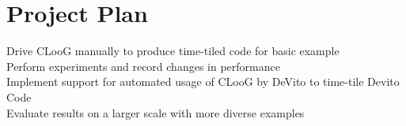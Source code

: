 \documentclass[a4paper,12pt,twoside]{report}
\begin{document}


\chapter{Project Plan}
Drive CLooG manually to produce time-tiled code for basic example \\
Perform experiments and record changes in performance \\
Implement support for automated usage of CLooG by DeVito to time-tile Devito Code \\
Evaluate results on a larger scale with more diverse examples




\end{document}
